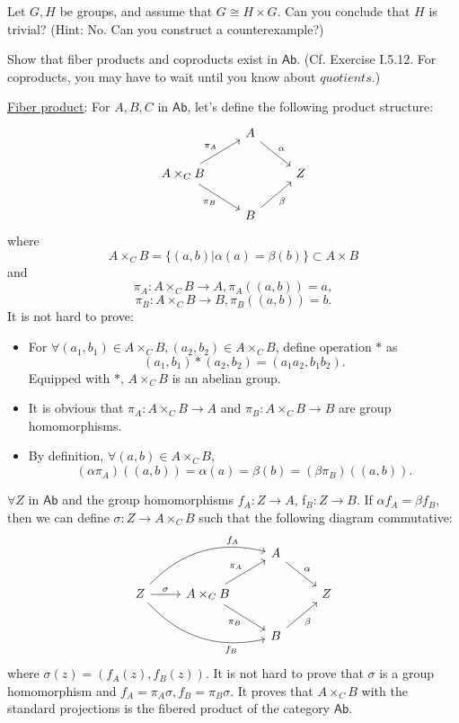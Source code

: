 \begin{problem}[3.4]
  Let $G, H$ be groups, and assume that $G\cong H\times G$. Can you conclude that $H$ is trivial? (Hint: No. Can you construct a counterexample?)
\end{problem}
\begin{solution}
\end{solution}

\begin{problem}[3.9]
Show that fiber products and coproducts exist in $\mathsf{Ab}$. (Cf. Exercise I.5.12. For
coproducts, you may have to wait until you know about $\mathit{quotients}$.)
\end{problem}
\begin{solution}
\underline{Fiber product}: For $A, B, C$ in $\mathsf{Ab}$, let's define the following product structure:
\[
\begin{tikzcd}
& A \arrow[dr, "\alpha"]& \\
A\times_C B \arrow[ur, "\pi_A"] \arrow[dr, "\pi_B"'] & & Z\\
& B \arrow[ur, "\beta"'] &
\end{tikzcd}
\]
where $$A\times_C B=\{(a,b)| \alpha(a)=\beta(b)\}\subset A\times B$$ and $$\pi_A: A\times_C B \to A, \pi_A((a,b)) = a,$$ 
$$\pi_B: A\times_C B \to B, \pi_B((a,b)) = b.$$ 
It is not hard to prove:
\begin{itemize}
\item For $\forall (a_1,b_1)\in A\times_C B, (a_2,b_2)\in A\times_C B$, define operation $\ast$ as  $$(a_1,b_1)\ast (a_2,b_2) = (a_1a_2, b_1b_2).$$
Equipped with $\ast$, $A\times_C B$ is an abelian group.
\item It is obvious that $\pi_A: A\times_C B \to A$ and $\pi_B: A\times_C B \to B$ are group homomorphisms.
\item By definition, $\forall (a,b)\in A\times_C B$, $$(\alpha\pi_A)((a,b)) = \alpha(a) = \beta(b) = (\beta\pi_B)((a,b)).$$
\end{itemize}

$\forall Z$ in $\mathsf{Ab}$ and the group homomorphisms $f_A: Z\to A$, f$_B: Z\to B$. If $\alpha f_A = \beta f_B$, then we can define $\sigma: Z\to A\times_C B$ such that the following diagram commutative:
\[
\begin{tikzcd}
& & A \arrow[dr, "\alpha"]& \\
Z\arrow[r, "\sigma"] \arrow[urr, bend left, "f_A" near end] \arrow[drr, bend right, "f_B"' near end] &A\times_C B \arrow[ur, "\pi_A"] \arrow[dr, "\pi_B"'] & & Z\\
&& B \arrow[ur, "\beta"'] &
\end{tikzcd}
\]
where $\sigma(z) = (f_A(z), f_B(z))$. It is not hard to prove that $\sigma$ is a group homomorphism and $f_A = \pi_A\sigma, f_B=\pi_B\sigma$. It proves that $A\times_C B$ with the standard projections is the fibered product of the category $\mathsf{Ab}$.


\end{solution}
